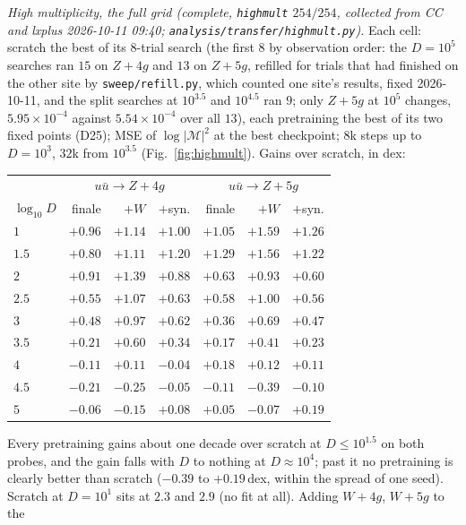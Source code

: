 \documentclass[11pt]{article}
\newcommand{\code}[1]{\texttt{#1}}
\begin{document}
\emph{High multiplicity, the full grid (complete, \code{highmult} $254/254$, collected from CC and lxplus 2026-10-11 09:40; \code{analysis/transfer/highmult.py}).} Each cell: scratch the best of its $8$-trial search (the first $8$ by observation order: the $D=10^5$ searches ran $15$ on $Z+4g$ and $13$ on $Z+5g$, refilled for trials that had finished on the other site by \code{sweep/refill.py}, which counted one site's results, fixed 2026-10-11, and the split searches at $10^{3.5}$ and $10^{4.5}$ ran $9$; only $Z+5g$ at $10^5$ changes, $5.95\times10^{-4}$ against $5.54\times10^{-4}$ over all $13$), each pretraining the best of its two fixed points (D25); MSE of $\log|\mathcal M|^2$ at the best checkpoint; $8$k steps up to $D=10^3$, $32$k from $10^{3.5}$ (Fig.~\ref{fig:highmult}). Gains over scratch, in dex:
\begin{center}\small
\begin{tabular}{l rrr rrr}
 & \multicolumn{3}{c}{$u\bar u\to Z+4g$} & \multicolumn{3}{c}{$u\bar u\to Z+5g$} \\
$\log_{10}D$ & finale & $+W$ & $+$syn. & finale & $+W$ & $+$syn. \\ \hline
$1$   & $+0.96$ & $+1.14$ & $+1.00$ & $+1.05$ & $+1.59$ & $+1.26$ \\
$1.5$ & $+0.80$ & $+1.11$ & $+1.20$ & $+1.29$ & $+1.56$ & $+1.22$ \\
$2$   & $+0.91$ & $+1.39$ & $+0.88$ & $+0.63$ & $+0.93$ & $+0.60$ \\
$2.5$ & $+0.55$ & $+1.07$ & $+0.63$ & $+0.58$ & $+1.00$ & $+0.56$ \\
$3$   & $+0.48$ & $+0.97$ & $+0.62$ & $+0.36$ & $+0.69$ & $+0.47$ \\
$3.5$ & $+0.21$ & $+0.60$ & $+0.34$ & $+0.17$ & $+0.41$ & $+0.23$ \\
$4$   & $-0.11$ & $+0.11$ & $-0.04$ & $+0.18$ & $+0.12$ & $+0.11$ \\
$4.5$ & $-0.21$ & $-0.25$ & $-0.05$ & $-0.11$ & $-0.39$ & $-0.10$ \\
$5$   & $-0.06$ & $-0.15$ & $+0.08$ & $+0.05$ & $-0.07$ & $+0.19$ \\
\end{tabular}
\end{center}
Every pretraining gains about one decade over scratch at $D\le10^{1.5}$ on both probes, and the gain falls with $D$ to
nothing at $D\approx10^4$; past it no pretraining is clearly better than scratch ($-0.39$ to $+0.19$\,dex, within the
spread of one seed). Scratch at $D=10^1$ sits at $2.3$ and $2.9$ (no fit at all). Adding $W+4g$, $W+5g$ to the
\end{document}
